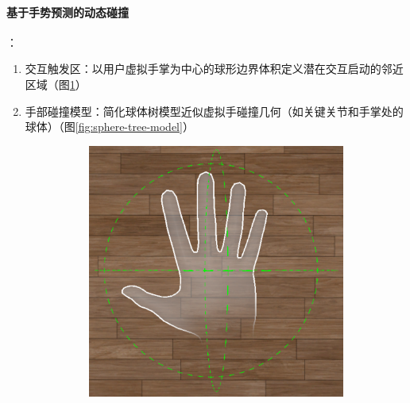 \documentclass[runningheads]{llncs}
\begin{document}
\paragraph{基于手势预测的动态碰撞}：
\begin{enumerate}
  \item 交互触发区：以用户虚拟手掌为中心的球形边界体积定义潜在交互启动的邻近区域（图\ref{fig:bounding-volume}）
  \item 手部碰撞模型：简化球体树模型近似虚拟手碰撞几何（如关键关节和手掌处的球体）（图\ref{fig:sphere-tree-model}）

  \begin{figure}
    \centering
    \begin{subfigure}{0.4\linewidth}
      \centering
      \includegraphics[width=\linewidth]{image/bounding-volume.pdf}
      \caption{}
      \label{fig:bounding-volume}
    \end{subfigure}
    \begin{subfigure}{0.4\linewidth}
      \centering

\end{subfigure}
\end{figure}
\end{enumerate}
\end{document}
